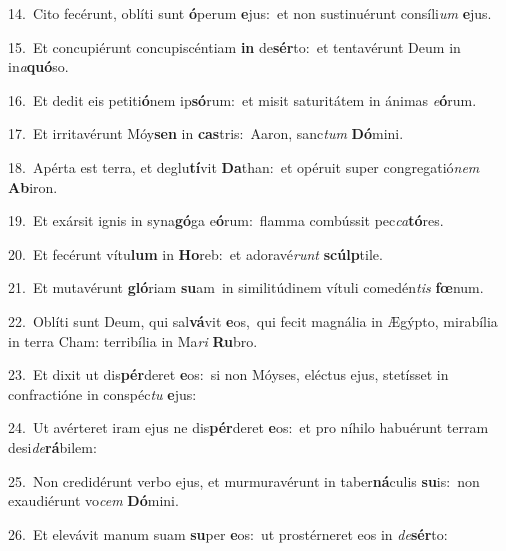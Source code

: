{\numbfont\textcolor{\numbcolor}{14.}}~Cito fecérunt, oblíti sunt \textbf{ó}\-perum \textbf{e}\-jus:~\star et non sustinuérunt consíli\textit{um} \textbf{e}\-jus.\par
{\numbfont\textcolor{\numbcolor}{15.}}~Et concupiérunt concupiscéntiam \textbf{in} de\-\textbf{sér}\-to:~\star et tentavérunt Deum in in\-\textit{a}\-\textbf{quó}so.\par
{\numbfont\textcolor{\numbcolor}{16.}}~Et dedit eis petiti\-\textbf{ó}\-nem ip\-\textbf{só}\-rum:~\star et misit saturitátem in ánimas \textit{e}\-\textbf{ó}rum.\par
{\numbfont\textcolor{\numbcolor}{17.}}~Et irritavérunt Móy\textbf{sen} in \textbf{cas}\-tris:~\star Aaron, sanc\textit{tum} \textbf{Dó}\-mini.\par
{\numbfont\textcolor{\numbcolor}{18.}}~Apérta est terra, et deglu\-\textbf{tí}\-vit \textbf{Da}\-than:~\star et opéruit super congregatió\textit{nem} \textbf{Ab}\-iron.\par
{\numbfont\textcolor{\numbcolor}{19.}}~Et exársit ignis in syna\-\textbf{gó}\-ga e\-\textbf{ó}\-rum:~\star flamma combússit pec\-\textit{ca}\-\textbf{tó}res.\par
{\numbfont\textcolor{\numbcolor}{20.}}~Et fecérunt vítu\textbf{lum} in \textbf{Ho}\-reb:~\star et adoravé\textit{runt} \textbf{scúlp}\-tile.\par
{\numbfont\textcolor{\numbcolor}{21.}}~Et mutavérunt \textbf{gló}\-riam \textbf{su}\-am~\star in similitúdinem vítuli comedén\textit{tis} \textbf{fœ}\-num.\par
{\numbfont\textcolor{\numbcolor}{22.}}~Oblíti sunt Deum, qui sal\-\textbf{vá}\-vit \textbf{e}\-os,~\star qui fecit magnália in Ægýpto, mirabília in terra Cham: terribília in Ma\textit{ri} \textbf{Ru}\-bro.\par
{\numbfont\textcolor{\numbcolor}{23.}}~Et dixit ut dis\-\textbf{pér}\-deret \textbf{e}\-os:~\star si non Móyses, eléctus ejus, stetísset in confractióne in conspéc\textit{tu} \textbf{e}\-jus:\par
{\numbfont\textcolor{\numbcolor}{24.}}~Ut avérteret iram ejus ne dis\-\textbf{pér}\-deret \textbf{e}\-os:~\star et pro níhilo habuérunt terram desi\-\textit{de}\-\textbf{rá}bilem:\par
{\numbfont\textcolor{\numbcolor}{25.}}~Non credidérunt verbo ejus, et murmuravérunt in taber\-\textbf{ná}\-culis \textbf{su}\-is:~\star non exaudiérunt vo\textit{cem} \textbf{Dó}\-mini.\par
{\numbfont\textcolor{\numbcolor}{26.}}~Et elevávit manum suam \textbf{su}\-per \textbf{e}\-os:~\star ut prostérneret eos in \textit{de}\-\textbf{sér}to:\par

